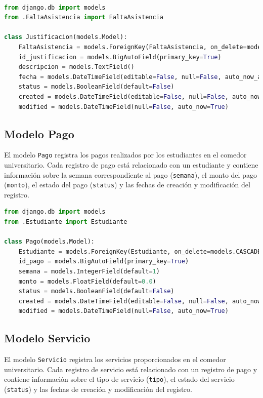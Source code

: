 \documentclass{article}
\begin{document}
\begin{lstlisting}[language=Python, caption={Justificacion}]

from django.db import models
from .FaltaAsistencia import FaltaAsistencia

class Justificacion(models.Model):
    FaltaAsistencia = models.ForeignKey(FaltaAsistencia, on_delete=models.CASCADE)
    id_justificacion = models.BigAutoField(primary_key=True)
    descripcion = models.TextField()
    fecha = models.DateTimeField(editable=False, null=False, auto_now_add=True)
    status = models.BooleanField(default=False)
    created = models.DateTimeField(editable=False, null=False, auto_now_add=True)
    modified = models.DateTimeField(null=False, auto_now=True)
\end{lstlisting}

\subsection{Modelo Pago}

El modelo \texttt{Pago} registra los pagos realizados por los estudiantes en el comedor universitario. Cada registro de pago está relacionado con un estudiante y contiene información sobre la semana correspondiente al pago (\texttt{semana}), el monto del pago (\texttt{monto}), el estado del pago (\texttt{status}) y las fechas de creación y modificación del registro.

\begin{lstlisting}[language=Python, caption={Pago}]
from django.db import models
from .Estudiante import Estudiante

class Pago(models.Model):
    Estudiante = models.ForeignKey(Estudiante, on_delete=models.CASCADE)
    id_pago = models.BigAutoField(primary_key=True)
    semana = models.IntegerField(default=1)
    monto = models.FloatField(default=0.0)
    status = models.BooleanField(default=False)
    created = models.DateTimeField(editable=False, null=False, auto_now_add=True)
    modified = models.DateTimeField(null=False, auto_now=True)
\end{lstlisting}

\subsection{Modelo Servicio}

El modelo \texttt{Servicio} registra los servicios proporcionados en el comedor universitario. Cada registro de servicio está relacionado con un registro de pago y contiene información sobre el tipo de servicio (\texttt{tipo}), el estado del servicio (\texttt{status}) y las fechas de creación y modificación del registro.
\end{document}
